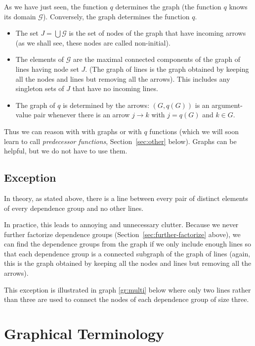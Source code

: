 As we have just seen, the function $q$ determines the graph
(the function $q$ knows its domain $\mathcal{G}$).
Conversely, the graph determines the function $q$.
\begin{itemize}
\item The set $J = \bigcup \mathcal{G}$ is the set of nodes of the graph
    that have incoming arrows (as we shall see, these nodes are called
    non-initial).
\item The elements of $\mathcal{G}$ are the maximal connected components
    of the graph of lines having node set $J$.
    (The graph of lines is the graph obtained by keeping all the nodes
    and lines but removing all the arrows).
    This includes any singleton sets of $J$ that have no incoming lines.
\item The graph of $q$ is determined by the arrows: $(G, q(G))$ is an
    argument-value pair whenever there is an arrow $j \longrightarrow k$
    with $j = q(G)$ and $k \in G$.
\end{itemize}

Thus we can reason with with graphs or with $q$ functions (which we will
soon learn to call \emph{predecessor functions}, Section~\ref{sec:other} below).
Graphs can be helpful, but we do not have to use them.

\subsection{Exception}
\label{sec:exception-dependence-group-lines}

In theory, as stated above, there is a line between every pair of distinct
elements of every dependence group and no other lines.

In practice, this leads to annoying and unnecessary clutter.
Because we never further factorize dependence groups
(Section~\ref{sec:further-factorize} above), we can find the dependence
groups from the graph if we only include enough lines so that each
dependence group is a connected subgraph of the graph of lines
(again, this is the graph obtained by keeping all the nodes and lines but
removing all the arrows).

This exception is illustrated in graph \eqref{gr:multi} below
where only two lines
rather than three are used to connect the nodes of each
dependence group of size three.

\section{Graphical Terminology}
\label{sec:graphical-terminology}

